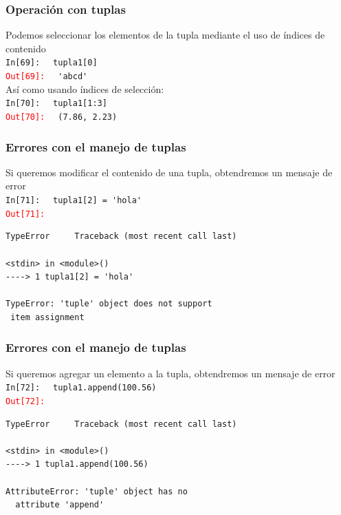\documentclass[12pt]{beamer}
\begin{document}
{\begin{frame}[fragile]
\frametitle{Operación con tuplas}
Podemos seleccionar los elementos de la tupla mediante el uso de índices de contenido
\\
\bigskip
\textcolor{ao}{\texttt{In[69]: }} \verb| tupla1[0]|
\\
\pause
\textcolor{red}{\texttt{Out[69]: }} \verb| 'abcd'|
\\
\bigskip
\pause
Así como usando índices de selección:
\\
\bigskip
\textcolor{ao}{\texttt{In[70]: }} \verb| tupla1[1:3]|
\\
\pause
\textcolor{red}{\texttt{Out[70]: }} \verb| (7.86, 2.23)|
\end{frame}
\begin{frame}[fragile]
\frametitle{Errores con el manejo de tuplas}
Si queremos modificar el contenido de una tupla, obtendremos un mensaje de error
\\
\bigskip
\textcolor{ao}{\texttt{In[71]: }} \verb| tupla1[2] = 'hola'|
\\
\pause
\textcolor{red}{\texttt{Out[71]: }} 
\begingroup
\fontsize{12}{12}\selectfont
\begin{verbatim}
TypeError     Traceback (most recent call last)

<stdin> in <module>()
----> 1 tupla1[2] = 'hola'

TypeError: 'tuple' object does not support
 item assignment
\end{verbatim}
\endgroup
\end{frame}
\begin{frame}[fragile]
\frametitle{Errores con el manejo de tuplas}
Si queremos agregar un elemento a la tupla, obtendremos un mensaje de error
\\
\bigskip
\textcolor{ao}{\texttt{In[72]: }} \verb| tupla1.append(100.56)|
\\
\pause
\textcolor{red}{\texttt{Out[72]: }} 
\begingroup
\fontsize{12}{12}\selectfont
\begin{verbatim}
TypeError     Traceback (most recent call last)

<stdin> in <module>()
----> 1 tupla1.append(100.56)

AttributeError: 'tuple' object has no 
  attribute 'append'
\end{verbatim}
\endgroup
\end{frame}
}
\end{document}

